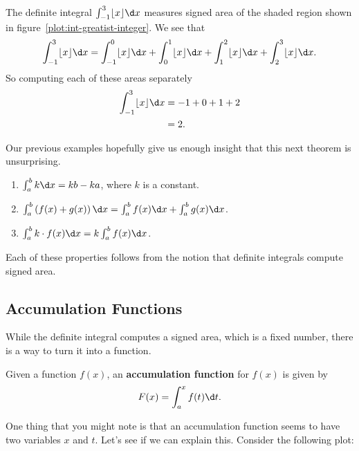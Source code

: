 \begin{solution}
The definite integral $\int_{-1}^3 \lfloor x\rfloor \d x$ measures
signed area of the shaded region shown in
figure~\ref{plot:int-greatist-integer}. We see that 
\[
\int_{-1}^3 \lfloor x\rfloor \d x = 
\int_{-1}^0 \lfloor x\rfloor \d x + \int_{0}^1 \lfloor x\rfloor \d x + \int_{1}^2 \lfloor x\rfloor \d x + \int_{2}^3 \lfloor x\rfloor \d x.
\]
So computing each of these areas separately
\begin{align*}
\int_{-1}^3 \lfloor x\rfloor \d x &= -1 + 0 + 1+2 \\
&= 2.
\end{align*}
\end{solution}

Our previous examples hopefully give us enough insight that this next
theorem is unsurprising.

\begin{mainTheorem}
\begin{enumerate}
\item $\int_a^b k \d x= kb-ka$, where $k$ is a constant.
\item $\int_a^b \left( f(x) + g(x) \right) \d x = \int_a^b f(x) \d x + \int_a^b
  g(x) \d x$.
\item $\int_a^b k \cdot f(x) \d x = k \int_a^b f(x) \d x$.
\end{enumerate}
\end{mainTheorem}
Each of these properties follows from the notion that definite
integrals compute signed area.

\subsection*{Accumulation Functions}

While the definite integral computes a signed area, which is a fixed
number, there is a way to turn it into a function.
\begin{definition}
Given a function $f(x)$, an \textbf{accumulation function} for
$f(x)$ is given by
\[
F(x) = \int_a^x f(t) \d t.
\]
\end{definition}

One thing that you might note is that an accumulation function seems
to have two variables $x$ and $t$. Let's see if we can explain
this. Consider the following plot:

